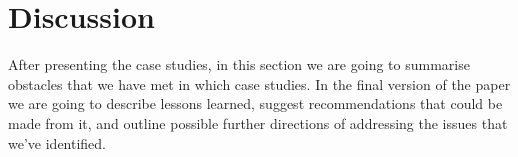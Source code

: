 \section{Discussion}
\label{s:discussion}

After presenting the case studies, in this section we are going to summarise 
obstacles that we have met in which case studies. In the final version of the 
paper we are going to describe lessons learned, suggest recommendations 
that could be made from it, and outline possible further directions of addressing 
the issues that we've identified.
